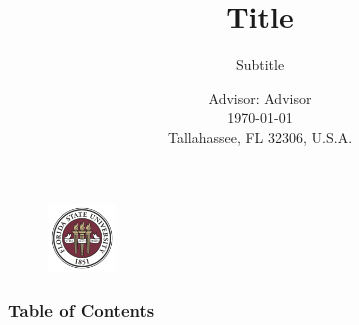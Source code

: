 \documentclass[hyperref={bookmarks=false},aspectratio=169]{beamer}
\title[Title]
{\bfseries{Title}}
\subtitle{Subtitle}
\author[Author]
{Xiaozhao Liu\inst{1}}
\institute[FSU]
{
Email: xl24@fsu.edu\\  
\inst{1}
  Department of Chemistry and Biochemistry\\
  Florida State University\\
}
\date[\today]
{Advisor: Advisor\\\today\\Tallahassee, FL 32306, U.S.A.}   %
\begin{document}
\begin{frame}
  \titlepage
  \vspace*{-0.6cm}
  \begin{figure}[htpb]
      \begin{center}
        \includegraphics[width=1.8cm]{./figures/FSU logo.png}  
      \end{center}
  \end{figure}
\end{frame}

\begin{frame}[b]     %
\frametitle{Table of Contents}
\vspace{1em} %
\fontsize{10pt}{9pt}\selectfont    %
\tableofcontents
\end{frame}
\end{document}
